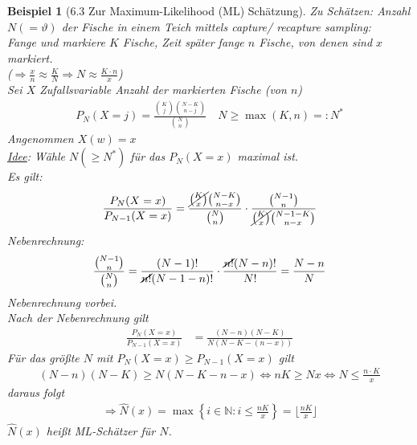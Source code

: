 \documentclass[a4paper,openany]{book}
\theoremstyle{mytheoremstyle}
\newtheorem*{bei}{Beispiel}
\theoremstyle{mytheoremstyle2}
\begin{document}
\begin{bei}[6.3 Zur Maximum-Likelihood (ML) Schätzung]
  Zu Schätzen: Anzahl $N(=\vartheta )$ der Fische in einem Teich mittels capture/ recapture sampling: \\
  Fange und markiere $K$ Fische, Zeit später fange $n$ Fische, von denen sind $x$ markiert. \\
  ($\Rightarrow \frac{x}{n}\approx \frac{K}{N}\Rightarrow N\approx \frac{K \cdot n}{x}$) \\
  Sei $X$ Zufallsvariable Anzahl der markierten Fische (von $n$) 
  \begin{align*}
    P_N(X=j)=\frac{\binom{K}{j}\binom{N-K}{n-j}}{\binom{N}{n}}\quad N \geq \max(K,n)=:N^*
  \end{align*}
  Angenommen $X(w)=x$ \\
  \underline{Idee}: Wähle $N (\geq N^*)$ für das $P_N(X=x)$ maximal ist. \\
  Es gilt:
  \begin{align*}
    \frac{P_N(X=x)}{P _{N-1}(X=x)}=\frac{\cancel{\binom{K}{x}}\binom{N-K}{n-x}}{\binom{N}{n}}\cdot \frac{\binom{N-1}{n}}{\cancel{\binom{K}{x}}\binom{N-1-K}{n-x}}
  \end{align*}
  Nebenrechnung: 
  \begin{align*}
    \frac{\binom{N-1}{n}}{\binom{N}{n}}=\frac{(N-1)!}{\cancel{n!}(N-1-n)!}\cdot \frac{\cancel{n!}(N-n)!}{N!}=\frac{N-n}{N}
  \end{align*}
  Nebenrechnung vorbei. \\
  Nach der Nebenrechnung gilt 
  \begin{align*}
    \frac{P_N(X=x)}{P _{N-1}(X=x)}
    &=\frac{(N-n)(N-K)}{N(N-K-(n-x))}
  \end{align*}
  Für das größte $N$ mit $P_N(X=x)\geq P _{N-1}(X=x)$ gilt 
  \begin{align*}
    (N-n)(N-K)\geq N(N-K-n-x)\Leftrightarrow nK \geq Nx \Leftrightarrow N \leq \frac{n \cdot K}{x}
  \end{align*}
  daraus folgt
  \begin{align*}
    \Rightarrow \hat{N}(x)=\max \left\{i \in \mathbb{N}:i \leq \frac{nK}{x}\right\}=\bigg\lfloor \frac{nK}{x}\bigg\rfloor
  \end{align*} 
  $\hat{N}(x)$ heißt ML-Schätzer für $N$.  
\end{bei}
\end{document}
